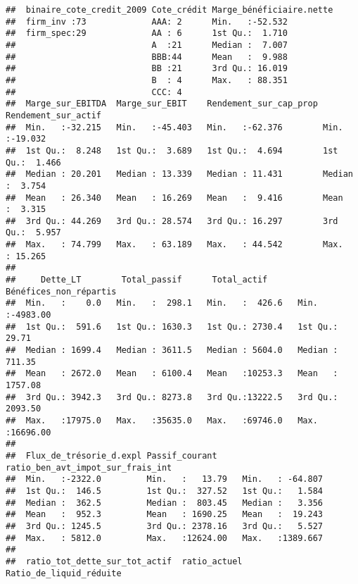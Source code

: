 \documentclass[
]{article}
\begin{document}
\begin{verbatim}
##  binaire_cote_credit_2009 Cote_crédit Marge_bénéficiaire.nette
##  firm_inv :73             AAA: 2      Min.   :-52.532         
##  firm_spec:29             AA : 6      1st Qu.:  1.710         
##                           A  :21      Median :  7.007         
##                           BBB:44      Mean   :  9.988         
##                           BB :21      3rd Qu.: 16.019         
##                           B  : 4      Max.   : 88.351         
##                           CCC: 4                              
##  Marge_sur_EBITDA  Marge_sur_EBIT    Rendement_sur_cap_prop Rendement_sur_actif
##  Min.   :-32.215   Min.   :-45.403   Min.   :-62.376        Min.   :-19.032    
##  1st Qu.:  8.248   1st Qu.:  3.689   1st Qu.:  4.694        1st Qu.:  1.466    
##  Median : 20.201   Median : 13.339   Median : 11.431        Median :  3.754    
##  Mean   : 26.340   Mean   : 16.269   Mean   :  9.416        Mean   :  3.315    
##  3rd Qu.: 44.269   3rd Qu.: 28.574   3rd Qu.: 16.297        3rd Qu.:  5.957    
##  Max.   : 74.799   Max.   : 63.189   Max.   : 44.542        Max.   : 15.265    
##                                                                                
##     Dette_LT        Total_passif      Total_actif      Bénéfices_non_répartis
##  Min.   :    0.0   Min.   :  298.1   Min.   :  426.6   Min.   :-4983.00      
##  1st Qu.:  591.6   1st Qu.: 1630.3   1st Qu.: 2730.4   1st Qu.:   29.71      
##  Median : 1699.4   Median : 3611.5   Median : 5604.0   Median :  711.35      
##  Mean   : 2672.0   Mean   : 6100.4   Mean   :10253.3   Mean   : 1757.08      
##  3rd Qu.: 3942.3   3rd Qu.: 8273.8   3rd Qu.:13222.5   3rd Qu.: 2093.50      
##  Max.   :17975.0   Max.   :35635.0   Max.   :69746.0   Max.   :16696.00      
##                                                                              
##  Flux_de_trésorie_d.expl Passif_courant     ratio_ben_avt_impot_sur_frais_int
##  Min.   :-2322.0         Min.   :   13.79   Min.   : -64.807                 
##  1st Qu.:  146.5         1st Qu.:  327.52   1st Qu.:   1.584                 
##  Median :  362.5         Median :  803.45   Median :   3.356                 
##  Mean   :  952.3         Mean   : 1690.25   Mean   :  19.243                 
##  3rd Qu.: 1245.5         3rd Qu.: 2378.16   3rd Qu.:   5.527                 
##  Max.   : 5812.0         Max.   :12624.00   Max.   :1389.667                 
##                                                                              
##  ratio_tot_dette_sur_tot_actif  ratio_actuel    Ratio_de_liquid_réduite

\end{verbatim}
\end{document}
